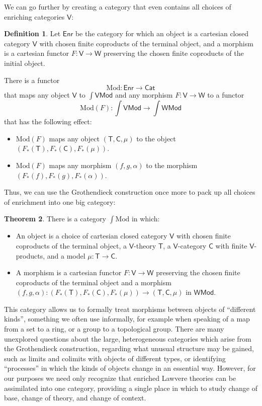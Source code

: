 \documentclass{amsart}
\theoremstyle{definition}
\newtheorem{theorem}{Theorem}
\newtheorem{definition}[theorem]{Definition}
\newcommand{\Cat}{\mathsf{Cat}}
\newcommand{\Mod}{\mathsf{Mod}}
\newcommand{\Enr}{\mathsf{Enr}}
\newcommand{\V}{\mathsf{V}}
\newcommand{\W}{\mathsf{W}}
\newcommand{\C}{\mathsf{C}}
\newcommand{\T}{\mathsf{T}}
\newcommand{\maps}{\colon}
\begin{document}
We can go further by creating a category that even contains all choices of enriching 
categories $\V$:

\begin{definition}
\label{defn:enrichment}
Let $\Enr$ be the category for which an object is a cartesian closed category $\V$ with chosen finite coproducts of the terminal object, and a morphism is a cartesian
 functor $F \maps \V \to \W$ preserving the chosen finite coproducts of 
the initial object.   
\end{definition}

There is a functor 
\[   \mathrm{Mod} \maps \Enr \to \Cat \]
that maps any object $\V$ to $\int \V\Mod$ and any morphism $F \maps \V \to \W$ to a functor 
\[    \mathrm{Mod}(F) \maps \textstyle{\int \V\Mod \to \int \W\Mod} \]
that has the following effect:
\begin{itemize}
\item  $\mathrm{Mod}(F)$ maps any object $(\T,\C,\mu)$ to
the object $(F_*(\T),F_*(\C),F_*(\mu))$. 
\item $\mathrm{Mod}(F)$ maps any morphism $ (f,g,\alpha)$
to the morphism $(F_*(f),F_*(g),F_*(\alpha))$. 
\end{itemize}
Thus, we can use the Grothendieck construction once more to pack up all choices of 
enrichment into one big category:

\begin{theorem}
There is a category $\int \mathrm{Mod}$ in which:
\begin{itemize}
\item An object is a choice of cartesian closed category $\V$ with chosen finite coproducts
of the terminal object, a $\V$-theory $\T$, a  $\V$-category $\C$ with finite $\V$-products, and a model $\mu \maps \T \to \C$.
\item A morphism is a cartesian functor $F \maps \V \to \W$ preserving the chosen finite
coproducts of the terminal object and a morphism $(f,g,\alpha) \maps (F_*(\T), F_*(\C), F_*(\mu)) \to (\T,\C,\mu)$ in $\W\Mod$.
\end{itemize}
\end{theorem}

This category allows us to formally treat morphisms between objects of ``different kinds'', something we often use informally, for example when speaking of a map from a set to a ring, or a group to a topological group.   There are many unexplored questions about the large, heterogeneous categories which arise from the Grothendieck construction, regarding what unusual structure may be gained, such as limits and colimits with objects of different types, or identifying ``processes'' in which the kinds of objects change in an essential way. However, for our purposes we need only recognize that enriched Lawvere theories can be assimilated into one category, providing a single place in which to study change of base, change of theory, and change of context.
\end{document}
